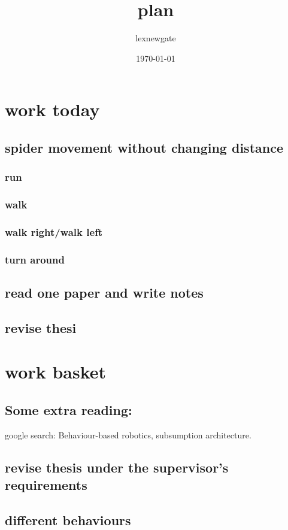 \documentclass[11pt]{article}
\author{lexnewgate}
\date{\today}
\title{plan}
\begin{document}
\maketitle
\tableofcontents

\section{work today}
\label{sec-1}
\subsection{spider movement without changing distance}
\label{sec-1-1}
\subsubsection{run}
\label{sec-1-1-1}
\subsubsection{walk}
\label{sec-1-1-2}
\subsubsection{walk right/walk left}
\label{sec-1-1-3}
\subsubsection{turn around}
\label{sec-1-1-4}
\subsection{read one paper and write notes}
\label{sec-1-2}
\subsection{revise thesi}
\label{sec-1-3}


\section{work basket}
\label{sec-2}
\subsection{Some extra reading:}
\label{sec-2-1}
google search: Behaviour-based robotics, subsumption architecture.
\subsection{revise thesis under the supervisor's requirements}
\label{sec-2-2}
\subsection{different behaviours}
\label{sec-2-3}
\end{document}
